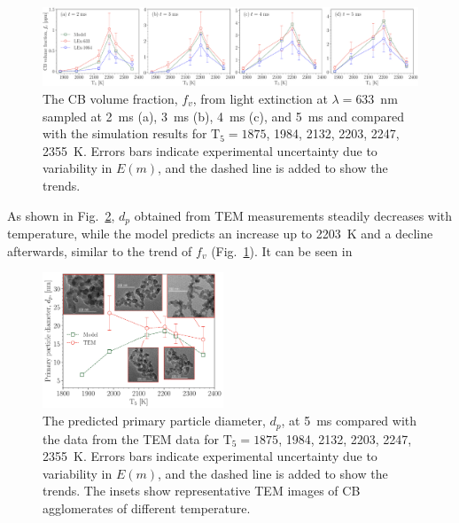 \begin{figure}[!t]
	\centering
	\includegraphics[width=1\textwidth]{Figures/fv_allconds_sampled.pdf}
	\caption{The CB volume fraction, $f_v$, from light extinction at $\lambda=633$~nm sampled at 2~ms (a), 3~ms (b), 4~ms (c), and 5~ms and compared with the simulation results for $\mathrm{T_5}=1875$, 1984, 2132, 2203, 2247, 2355~K. Errors bars indicate experimental uncertainty due to variability in $E(m)$, and the dashed line is added to show the trends.}
	\label{fig:fv_sampled_comp} 
\end{figure}

As shown in Fig.~\ref{fig:dp_sampled_comp}, $d_p$ obtained from TEM measurements steadily decreases with temperature, while the model predicts an increase up to 2203~K and a decline afterwards, similar to the trend of $f_v$ (Fig.~\ref{fig:fv_sampled_comp}). It can be seen in 

\begin{figure}[!t]
	\centering
	\includegraphics[width=0.48\textwidth]{Figures/dp_allconds_sampled.pdf}
	\caption{The predicted primary particle diameter, $d_p$, at 5~ms compared with the data from the TEM data for $\mathrm{T_5}=1875$, 1984, 2132, 2203, 2247, 2355~K. Errors bars indicate experimental uncertainty due to variability in $E(m)$, and the dashed line is added to show the trends. The insets show representative TEM images of CB agglomerates of different temperature.}
	\label{fig:dp_sampled_comp} 
\end{figure}


